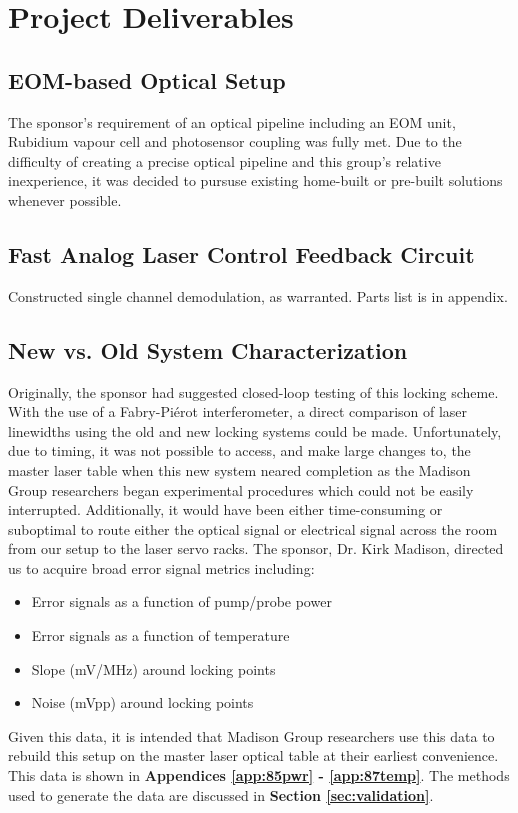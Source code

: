 \newpage
\section{Project Deliverables}

\subsection{EOM-based Optical Setup}

The sponsor's requirement of an optical pipeline including an EOM unit, Rubidium vapour cell and photosensor coupling was fully met. Due to the difficulty of creating a precise optical pipeline and this group's relative inexperience, it was decided to pursuse existing home-built or pre-built solutions whenever possible.

\subsection{Fast Analog Laser Control Feedback Circuit}

Constructed single channel demodulation, as warranted. Parts list is in appendix.

\subsection{New vs. Old System Characterization}

Originally, the sponsor had suggested closed-loop testing of this locking scheme. With the use of a Fabry-Pi{\'e}rot interferometer, a direct comparison of laser linewidths using the old and new locking systems could be made. Unfortunately, due to timing, it was not possible to access, and make large changes to, the master laser table when this new system neared completion as the Madison Group researchers began experimental procedures which could not be easily interrupted. Additionally, it would have been either time-consuming or suboptimal to route either the optical signal or electrical signal across the room from our setup to the laser servo racks. The sponsor, Dr. Kirk Madison, directed us to acquire broad error signal metrics including:
\begin{itemize}
    \item Error signals as a function of pump/probe power
    \item Error signals as a function of temperature
    \item Slope (mV/MHz) around locking points
    \item Noise (mVpp) around locking points
\end{itemize}
Given this data, it is intended that Madison Group researchers use this data to rebuild this setup on the master laser optical table at their earliest convenience. This data is shown in \textbf{Appendices \ref{app:85pwr} - \ref{app:87temp}}. The methods used to generate the data are discussed in \textbf{Section \ref{sec:validation}}.